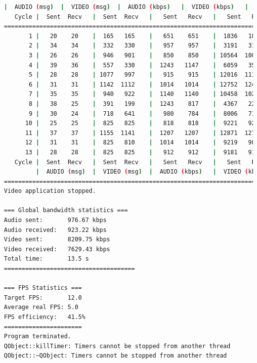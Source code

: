 \begin{lstlisting}[language=bash,basicstyle=\ttfamily\tiny]
         |  AUDIO (msg)  |  VIDEO (msg)  |  AUDIO (kbps)   |  VIDEO (kbps)   |     CPU (%) 
   Cycle |  Sent  Recv   |  Sent  Recv   |   Sent   Recv   |   Sent   Recv   | Program System
================================================================================================
       1 |   20    20    |  165   165    |   651    651    |  1836   1836    |  24      0       
       2 |   34    34    |  332   330    |   957    957    |  3191   3172    |  30     76       
       3 |   26    26    |  946   901    |   850    850    | 10564  10059    |  24     72       
       4 |   39    36    |  557   330    |  1243   1147    |  6059   3590    |  38     63       
       5 |   28    28    | 1077   997    |   915    915    | 12016  11123    |  28     71       
       6 |   31    31    | 1142  1112    |  1014   1014    | 12752  12419    |  45     74       
       7 |   35    35    |  940   922    |  1140   1140    | 10458  10257    |  34     73       
       8 |   38    25    |  391   199    |  1243    817    |  4367   2220    |  45     66       
       9 |   30    24    |  718   641    |   980    784    |  8006   7151    |  43     75       
      10 |   25    25    |  825   825    |   818    818    |  9221   9221    |  38     78       
      11 |   37    37    | 1155  1141    |  1207   1207    | 12871  12719    |  43     75       
      12 |   31    31    |  825   810    |  1014   1014    |  9219   9051    |  32     76       
      13 |   28    28    |  825   825    |   912    912    |  9181   9181    |  30     70       
   Cycle |  Sent  Recv   |  Sent  Recv   |   Sent   Recv   |   Sent   Recv   | Program System
         |  AUDIO (msg)  |  VIDEO (msg)  |  AUDIO (kbps)   |  VIDEO (kbps)   |     CPU (%) 
===========================================================================================
Video application stopped.

=== Global bandwidth statistics ===
Audio sent:       976.67 kbps
Audio received:   923.22 kbps
Video sent:       8209.75 kbps
Video received:   7629.43 kbps
Total time:       13.5 s
=====================================

=== FPS Statistics ===
Target FPS:       12.0
Average real FPS: 5.0
FPS efficiency:   41.5%
======================
Program terminated.
QObject::killTimer: Timers cannot be stopped from another thread
QObject::~QObject: Timers cannot be stopped from another thread
\end{lstlisting}
\vspace{\baselineskip}

